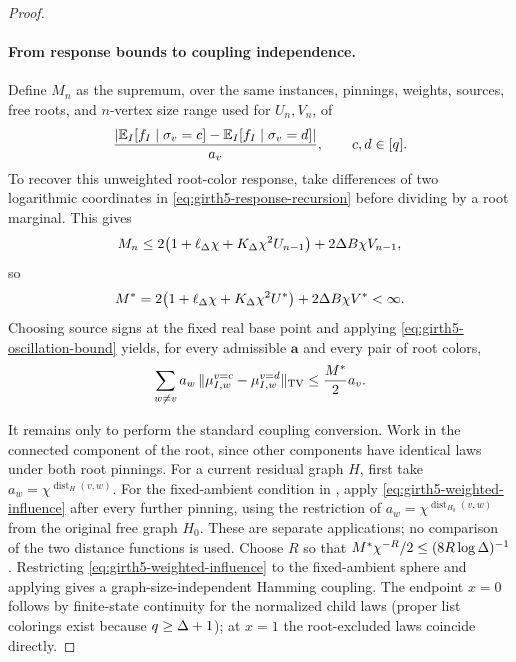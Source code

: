 \begin{proof}
\paragraph{From response bounds to coupling independence.}
Define $M_n$ as the supremum, over the same instances, pinnings, weights,
sources, free roots, and $n$-vertex size range used for $U_n,V_n$, of
\begin{equation}\label{eq:girth5-oscillation-definition}
 \frac{\left|\mathbb E_I[f_I\mid\sigma_v=c]
 -\mathbb E_I[f_I\mid\sigma_v=d]\right|}{a_v},
 \qquad c,d\in[q].
\end{equation}
To recover this unweighted root-color response, take differences of two logarithmic
coordinates in \eqref{eq:girth5-response-recursion} before dividing by a root marginal.  This gives
\[
 M_n\le2\bigl(1+\ell_\Delta\chi+K_\Delta\chi^2U_{n-1}\bigr)
      +2\Delta B\chi V_{n-1},
\]
so
\begin{equation}\label{eq:girth5-oscillation-bound}
 M^*=2\bigl(1+\ell_\Delta\chi+K_\Delta\chi^2U^*\bigr)
      +2\Delta B\chi V^*<\infty.
\end{equation}
Choosing source signs at the fixed real base point and applying \eqref{eq:girth5-oscillation-bound} yields,
for every admissible $\mathbf a$ and every pair of root colors,
\begin{equation}\label{eq:girth5-weighted-influence}
 \sum_{w\ne v}a_w\,
 \|\mu_{I,w}^{v=c}-\mu_{I,w}^{v=d}\|_{\rm TV}
 \le \frac{M^*}{2}a_v.
\end{equation}

It remains only to perform the standard coupling conversion.  Work in the connected component of the root, since other components have
identical laws under both root pinnings.  For a current residual graph $H$,
first take $a_w=\chi^{\operatorname{dist}_H(v,w)}$.  For the fixed-ambient condition
in \cite[Lemma~5.13]{CLMM2023}, apply \eqref{eq:girth5-weighted-influence} after every further pinning, using the
restriction of $a_w=\chi^{\operatorname{dist}_{H_0}(v,w)}$ from the original
free graph $H_0$.  These are separate applications; no comparison of the two
distance functions is used.  Choose $R$ so that
$M^*\chi^{-R}/2\le(8R\log\Delta)^{-1}$.  Restricting \eqref{eq:girth5-weighted-influence} to the fixed-ambient
sphere and applying \cite[Lemma~5.13]{CLMM2023} gives a graph-size-independent Hamming
coupling.  The endpoint $x=0$ follows by finite-state continuity for the
normalized child laws (proper list colorings exist because $q\ge\Delta+1$);
at $x=1$ the root-excluded laws coincide directly.
\end{proof}
